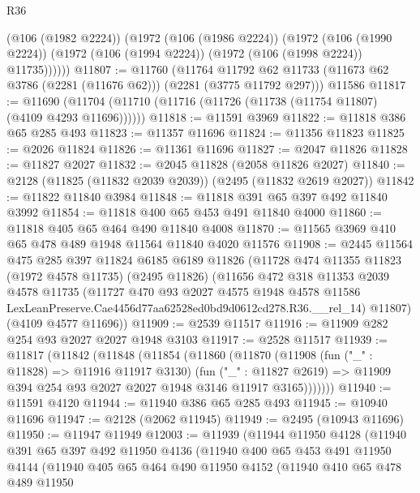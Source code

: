 \begin{lexlean}{R36}
\begin{coremodule}
        (@106 (@1982 @2224))
        (@1972
          (@106 (@1986 @2224))
          (@1972
            (@106 (@1990 @2224))
            (@1972 (@106 (@1994 @2224)) (@1972 (@106 (@1998 @2224)) @11735))))))
@11807 := @11760
    (@11764 @11792 @62 @11733 (@11673 @62 @3786 (@2281 (@11676 @62))) (@2281 (@3775 @11792 @297)))
    @11586
@11817 := @11690 (@11704 (@11710 (@11716 (@11726 (@11738 (@11754 @11807) (@4109 @4293 @11696))))))
@11818 := @11591 @3969
@11822 := @11818 @386 @65 @285 @493
@11823 := @11357 @11696
@11824 := @11356 @11823
@11825 := @2026 @11824
@11826 := @11361 @11696
@11827 := @2047 @11826
@11828 := @11827 @2027
@11832 := @2045 @11828 (@2058 @11826 @2027)
@11840 := @2128 (@11825 (@11832 @2039 @2039)) (@2495 (@11832 @2619 @2027))
@11842 := @11822 @11840 @3984
@11848 := @11818 @391 @65 @397 @492 @11840 @3992
@11854 := @11818 @400 @65 @453 @491 @11840 @4000
@11860 := @11818 @405 @65 @464 @490 @11840 @4008
@11870 := @11565 @3969 @410 @65 @478 @489 @1948 @11564 @11840 @4020 @11576
@11908 := @2445
    @11564
    @475
    @285
    @397
    @11824
    @6185
    @6189
    @11826
    (@11728
      @474
      @11355
      @11823
      (@1972 @4578 @11735)
      (@2495 @11826)
      (@11656
        @472
        @318
        @11353
        @2039
        @4578
        @11735
        (@11727
          @470
          @93
          @2027
          @4575
          @1948
          @4578
          @11586
          LexLeanPreserve.Cae4456d77aa62528ed0bd9d0612cd278.R36.__rel_14)
        @11807)
      (@4109 @4577 @11696))
@11909 := @2539 @11517
@11916 := @11909 @282 @254 @93 @2027 @2027 @1948 @3103
@11917 := @2528 @11517
@11939 := @11817
    (@11842
      (@11848
        (@11854
          (@11860
            (@11870
              (@11908
                (fun ("_" : @11828) => @11916 @11917 @3130)
                (fun ("_" : @11827 @2619) =>
                @11909 @394 @254 @93 @2027 @2027 @1948 @3146 @11917 @3165)))))))
@11940 := @11591 @4120
@11944 := @11940 @386 @65 @285 @493
@11945 := @10940 @11696
@11947 := @2128 (@2062 @11945)
@11949 := @2495 (@10943 @11696)
@11950 := @11947 @11949
@12003 := @11939
    (@11944
      @11950
      @4128
      (@11940
        @391
        @65
        @397
        @492
        @11950
        @4136
        (@11940
          @400
          @65
          @453
          @491
          @11950
          @4144
          (@11940
            @405
            @65
            @464
            @490
            @11950
            @4152
            (@11940
              @410
              @65
              @478
              @489
              @11950

\end{coremodule}
\end{lexlean}
